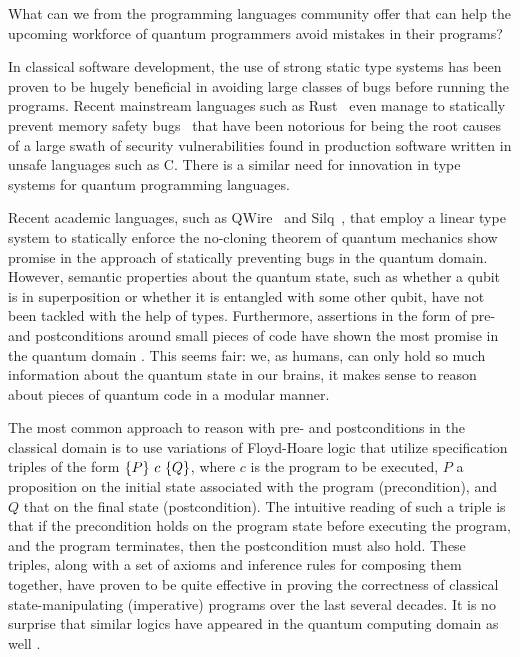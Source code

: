 What can we from the programming languages community offer that can help the upcoming workforce of quantum programmers avoid mistakes in their programs?

In classical software development, the use of strong static type systems has been proven to be hugely beneficial in avoiding large classes of bugs before running the programs. Recent mainstream languages such as Rust~\parencite{matsakis2014} even manage to statically prevent memory safety bugs~\parencite{xu2021memorysafety,Jung2017,Jung2021} that have been notorious for being the root causes of a large swath of security vulnerabilities found in production software written in unsafe languages such as C. There is a similar need for innovation in type systems for quantum programming languages.

Recent academic languages, such as QWire~\parencite{qwire2017,paykin2018} and Silq~\parencite{silq20}, that employ a linear type system to statically enforce the no-cloning theorem of quantum mechanics show promise in the approach of statically preventing bugs in the quantum domain. However, semantic properties about the quantum state, such as whether a qubit is in superposition or whether it is entangled with some other qubit, have not been tackled with the help of types. Furthermore, assertions in the form of pre- and postconditions around small pieces of code have shown the most promise in the quantum domain \parencite{huang2019,qdb2018}. This seems fair: we, as humans, can only hold so much information about the quantum state in our brains, it makes sense to reason about pieces of quantum code in a modular manner.

The most common approach to reason with pre- and postconditions in the classical domain is to use variations of Floyd-Hoare logic that utilize specification triples of the form $\{P\} ~c~ \{Q\}$, where $c$ is the program to be executed, $P$ a proposition on the initial state associated with the program (precondition), and $Q$ that on the final state (postcondition). The intuitive reading of such a triple is that if the precondition holds on the program state before executing the program, and the program terminates, then the postcondition must also hold. These triples, along with a set of axioms and inference rules for composing them together, have proven to be quite effective in proving the correctness of classical state-manipulating (imperative) programs over the last several decades. It is no surprise that similar logics have appeared in the quantum computing domain as well \parencite{aqhl2019,floydhoare2012,unruh2019,wpe2016}.


